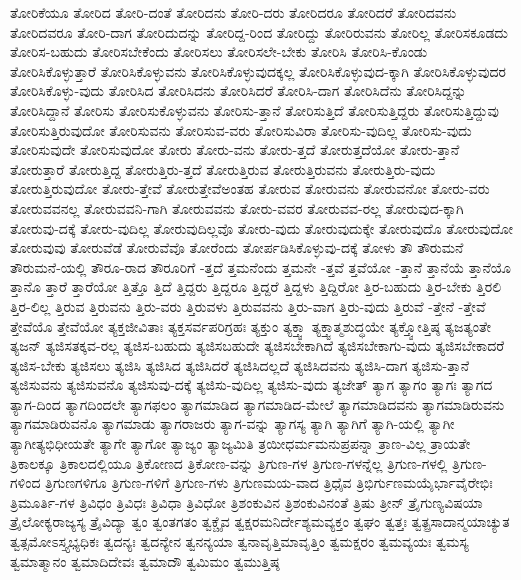 {ತೋರಿಕೆಯೂ
ತೋರಿದ
ತೋರಿ-ದಂತೆ
ತೋರಿದನು
ತೋರಿ-ದರು
ತೋರಿದರೂ
ತೋರಿದರೆ
ತೋರಿದವನು
ತೋರಿದವರೂ
ತೋರಿ-ದಾಗ
ತೋರಿದುದನ್ನು
ತೋರಿದ್ದ-ರಿಂದ
ತೋರಿದ್ದು
ತೋರಿರುವನು
ತೋರಿಲ್ಲ
ತೋರಿಸಕೂಡದು
ತೋರಿಸ-ಬಹುದು
ತೋರಿಸಬೇಕೆಂದು
ತೋರಿಸಲು
ತೋರಿಸಲೇ-ಬೇಕು
ತೋರಿಸಿ
ತೋರಿಸಿ-ಕೊಂಡು
ತೋರಿಸಿಕೊಳ್ಳುತ್ತಾರೆ
ತೋರಿಸಿಕೊಳ್ಳುವನು
ತೋರಿಸಿಕೊಳ್ಳುವುದಕ್ಕಲ್ಲ
ತೋರಿಸಿಕೊಳ್ಳುವುದ-ಕ್ಕಾಗಿ
ತೋರಿಸಿಕೊಳ್ಳುವುದರ
ತೋರಿಸಿಕೊಳ್ಳು-ವುದು
ತೋರಿಸಿದ
ತೋರಿಸಿದನು
ತೋರಿಸಿದರೆ
ತೋರಿಸಿ-ದಾಗ
ತೋರಿಸಿದೆನು
ತೋರಿಸಿದ್ದನ್ನು
ತೋರಿಸಿದ್ದಾನೆ
ತೋರಿಸು
ತೋರಿಸುಕೊಳ್ಳುವನು
ತೋರಿಸು-ತ್ತಾನೆ
ತೋರಿಸುತ್ತಿದೆ
ತೋರಿಸುತ್ತಿದ್ದರು
ತೋರಿಸುತ್ತಿದ್ದುವು
ತೋರಿಸುತ್ತಿರುವುದೋ
ತೋರಿಸುವನು
ತೋರಿಸುವ-ವರು
ತೋರಿಸುವಿರಾ
ತೋರಿಸು-ವುದಿಲ್ಲ
ತೋರಿಸು-ವುದು
ತೋರಿಸುವುದೇ
ತೋರಿಸುವುದೋ
ತೋರು
ತೋರು-ವನು
ತೋರು-ತ್ತದೆ
ತೋರುತ್ತದೆಯೋ
ತೋರು-ತ್ತಾನೆ
ತೋರುತ್ತಾರೆ
ತೋರುತ್ತಿದ್ದ
ತೋರುತ್ತಿರು-ತ್ತದೆ
ತೋರುತ್ತಿರುವ
ತೋರುತ್ತಿರುವನು
ತೋರುತ್ತಿರು-ವುದು
ತೋರುತ್ತಿರುವುದೋ
ತೋರು-ತ್ತೇವೆ
ತೋರುತ್ತೇವೆಅಂತಹ
ತೋರುವ
ತೋರುವನು
ತೋರುವನೋ
ತೋರು-ವರು
ತೋರುವವನಲ್ಲ
ತೋರುವವನಿ-ಗಾಗಿ
ತೋರುವವನು
ತೋರು-ವವರ
ತೋರುವವ-ರಲ್ಲ
ತೋರುವುದ-ಕ್ಕಾಗಿ
ತೋರುವು-ದಕ್ಕೆ
ತೋರು-ವುದಿಲ್ಲ
ತೋರುವುದಿಲ್ಲವೊ
ತೋರು-ವುದು
ತೋರುವುದುಕ್ಕೇ
ತೋರುವುದೊ
ತೋರುವುದೋ
ತೋರುವುವು
ತೋರುವೆಡೆ
ತೋರುವೆವೊ
ತೋರೆಂದು
ತೋರ್ಪಡಿಸಿಕೊಳ್ಳುವು-ದಕ್ಕೆ
ತೋಳು
ತೌ
ತೌರುಮನೆ
ತೌರುಮನೆ-ಯಲ್ಲಿ
ತೌರೂ-ರಾದ
ತೌರೂರಿಗೆ
-ತ್ತದೆ
ತ್ತಮನೆಂದು
ತ್ತಮನೇ
-ತ್ತವೆ
ತ್ತವೆಯೋ
-ತ್ತಾನೆ
ತ್ತಾನೆಯೆ
ತ್ತಾನೆಯೊ
ತ್ತಾನೊ
ತ್ತಾರೆ
ತ್ತಾರೆಯೋ
ತ್ತಿತ್ತೊ
ತ್ತಿದೆ
ತ್ತಿದ್ದರು
ತ್ತಿದ್ದರೂ
ತ್ತಿದ್ದರೆ
ತ್ತಿದ್ದಳು
ತ್ತಿದ್ದಿರೋ
ತ್ತಿರ-ಬಹುದು
ತ್ತಿರ-ಬೇಕು
ತ್ತಿರಲಿ
ತ್ತಿರ-ಲಿಲ್ಲ
ತ್ತಿರುವ
ತ್ತಿರುವನು
ತ್ತಿರು-ವರು
ತ್ತಿರುವಳು
ತ್ತಿರುವವನು
ತ್ತಿರು-ವಾಗ
ತ್ತಿರು-ವುದು
ತ್ತಿರುವೆ
-ತ್ತೇನೆ
-ತ್ತೇವೆ
ತ್ತೇವೆಯೊ
ತ್ತೇವೆಯೋ
ತ್ಯಕ್ತಜೀವಿತಾಃ
ತ್ಯಕ್ತಸರ್ವಪರಿಗ್ರಹಃ
ತ್ಯಕ್ತುಂ
ತ್ಯಕ್ತ್ವಾ
ತ್ಯಕ್ತ್ವಾತ್ಮಶುದ್ಧಯೇ
ತ್ಯಕ್ತ್ವೋತ್ತಿಷ್ಠ
ತ್ಯಜತ್ಯಂತೇ
ತ್ಯಜನ್
ತ್ಯಜಿಸತಕ್ಕವ-ರಲ್ಲ
ತ್ಯಜಿಸ-ಬಹುದು
ತ್ಯಜಿಸಬಹುದೇ
ತ್ಯಜಿಸಬೇಕಾಗಿದೆ
ತ್ಯಜಿಸಬೇಕಾಗು-ವುದು
ತ್ಯಜಿಸಬೇಕಾದರೆ
ತ್ಯಜಿಸ-ಬೇಕು
ತ್ಯಜಿಸಲು
ತ್ಯಜಿಸಿ
ತ್ಯಜಿಸಿದ
ತ್ಯಜಿಸಿದರೆ
ತ್ಯಜಿಸಿದಲ್ಲದೆ
ತ್ಯಜಿಸಿದವನು
ತ್ಯಜಿಸಿ-ದಾಗ
ತ್ಯಜಿಸು-ತ್ತಾನೆ
ತ್ಯಜಿಸುವನು
ತ್ಯಜಿಸುವನೊ
ತ್ಯಜಿಸುವು-ದಕ್ಕೆ
ತ್ಯಜಿಸು-ವುದಿಲ್ಲ
ತ್ಯಜಿಸು-ವುದು
ತ್ಯಜೇತ್
ತ್ಯಾಗ
ತ್ಯಾಗಂ
ತ್ಯಾಗಃ
ತ್ಯಾಗದ
ತ್ಯಾಗ-ದಿಂದ
ತ್ಯಾಗದಿಂದಲೇ
ತ್ಯಾಗಫಲಂ
ತ್ಯಾಗಮಾಡಿದ
ತ್ಯಾಗಮಾಡಿದ-ಮೇಲೆ
ತ್ಯಾಗಮಾಡಿದವನು
ತ್ಯಾಗಮಾಡಿರುವನು
ತ್ಯಾಗಮಾಡಿರುವನೊ
ತ್ಯಾಗಮಾಡು
ತ್ಯಾಗರಾಜರು
ತ್ಯಾಗ-ವನ್ನು
ತ್ಯಾಗಸ್ಯ
ತ್ಯಾಗಿ
ತ್ಯಾಗಿಗೆ
ತ್ಯಾಗಿ-ಯಲ್ಲಿ
ತ್ಯಾಗೀ
ತ್ಯಾಗೀತ್ಯಭಿಧೀಯತೇ
ತ್ಯಾಗೇ
ತ್ಯಾಗೋ
ತ್ಯಾಜ್ಯಂ
ತ್ಯಾಜ್ಯಮಿತಿ
ತ್ರಯೀಧರ್ಮಮನುಪ್ರಪನ್ನಾ
ತ್ರಾಣ-ವಿಲ್ಲ
ತ್ರಾಯತೇ
ತ್ರಿಕಾಲಕ್ಕೂ
ತ್ರಿಕಾಲದಲ್ಲಿಯೂ
ತ್ರಿಕೋಣದ
ತ್ರಿಕೋಣ-ವನ್ನು
ತ್ರಿಗುಣ-ಗಳ
ತ್ರಿಗುಣ-ಗಳನ್ನೆಲ್ಲ
ತ್ರಿಗುಣ-ಗಳಲ್ಲಿ
ತ್ರಿಗುಣ-ಗಳಿಂದ
ತ್ರಿಗುಣಗಳಿಗೂ
ತ್ರಿಗುಣ-ಗಳಿಗೆ
ತ್ರಿಗುಣ-ಗಳು
ತ್ರಿಗುಣಮಯ-ವಾದ
ತ್ರಿಧೈವ
ತ್ರಿಭಿರ್ಗುಣಮಯೈರ್ಭಾವೈರೇಭಿಃ
ತ್ರಿಮೂರ್ತಿ-ಗಳ
ತ್ರಿವಿಧಂ
ತ್ರಿವಿಧಃ
ತ್ರಿವಿಧಾ
ತ್ರಿವಿಧೋ
ತ್ರಿಶಂಕುವಿನ
ತ್ರಿಶಂಕುವಿನಂತೆ
ತ್ರಿಷು
ತ್ರೀನ್
ತ್ರೈಗುಣ್ಯವಿಷಯಾ
ತ್ರೈಲೋಕ್ಯರಾಜ್ಯಸ್ಯ
ತ್ರೈವಿದ್ಯಾ
ತ್ವಂ
ತ್ವಂತಗತಂ
ತ್ವಕ್ಚೈವ
ತ್ವಕ್ಷರಮನಿರ್ದೇಶ್ಯಮವ್ಯಕ್ತಂ
ತ್ವಘಂ
ತ್ವತ್ತಃ
ತ್ವತ್ಪ್ರಸಾದಾನ್ಮಯಾಚ್ಯುತ
ತ್ವತ್ಸಮೋಽಸ್ತ್ಯಭ್ಯಧಿಕಃ
ತ್ವದನ್ಯಃ
ತ್ವದನ್ಯೇನ
ತ್ವನನ್ಯಯಾ
ತ್ವನಾವೃತ್ತಿಮಾವೃತ್ತಿಂ
ತ್ವಮಕ್ಷರಂ
ತ್ವಮವ್ಯಯಃ
ತ್ವಮಸ್ಯ
ತ್ವಮಾತ್ಮಾನಂ
ತ್ವಮಾದಿದೇವಃ
ತ್ವಮಾದೌ
ತ್ವಮಿಮಂ
ತ್ವಮುತ್ತಿಷ್ಠ
}
